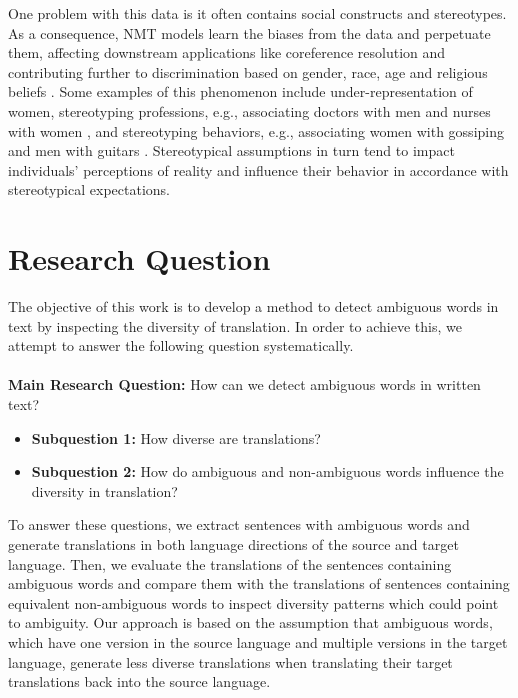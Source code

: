 One problem with this data is it often contains social constructs and stereotypes. As a consequence, NMT models learn the biases from the data and perpetuate them, affecting downstream applications like coreference resolution \parencite{Zhao_2018_coreference} and contributing further to discrimination based on gender, race, age and religious beliefs \parencite{Rudinger_2017}. Some examples of this phenomenon include under-representation of women, stereotyping professions, e.g., associating doctors with men and nurses with women \parencite{Escud_Font_2019}, and stereotyping behaviors, e.g., associating women with gossiping and men with guitars \parencite{Rudinger_2017}. Stereotypical assumptions in turn tend to impact individuals' perceptions of reality and influence their behavior in accordance with stereotypical expectations.

\section{Research Question}
\label{sec:Introduction:Questions}

The objective of this work is to develop a method to detect ambiguous words in text by inspecting the diversity of translation. In order to achieve this, we attempt to answer the following question systematically.

\paragraph{} \textbf{Main Research Question:} How can we detect ambiguous words in written text?
\begin{itemize} 
    \item \textbf{Subquestion 1:} How diverse are translations?
    \item \textbf{Subquestion 2:} How do ambiguous and non-ambiguous words influence the diversity in translation? 
\end{itemize}

To answer these questions, we extract sentences with ambiguous words and generate translations in both language directions of the source and target language. Then, we evaluate the translations of the sentences containing ambiguous words and compare them with the translations of sentences containing equivalent non-ambiguous words to inspect diversity patterns which could point to ambiguity. Our approach is based on the assumption that ambiguous words, which have one version in the source language and multiple versions in the target language, generate less diverse translations when translating their target translations back into the source language.


